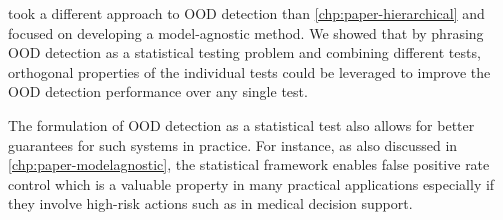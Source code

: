 
\vspace{1em}
\textbf{} took a different approach to OOD detection than \cref{chp:paper-hierarchical} and focused on developing a model-agnostic method. 
We showed that by phrasing OOD detection as a statistical testing problem and combining different tests, orthogonal properties of the individual tests could be leveraged to improve the OOD detection performance over any single test.

The formulation of OOD detection as a statistical test also allows for better guarantees for such systems in practice. For instance, as also discussed in \cref{chp:paper-modelagnostic}, the statistical framework enables false positive rate control which is a valuable property in many practical applications especially if they involve high-risk actions such as in medical decision support. 





